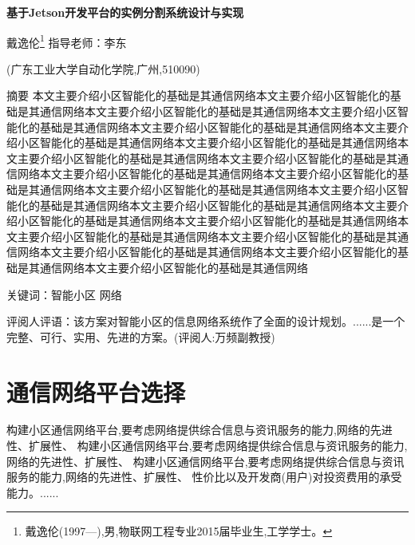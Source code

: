 \documentclass[openright, twoside]{gdutthesis-excellent}
\begin{document}
\begin{center}
{\vspace{30pt}\bfseries 基于Jetson开发平台的实例分割系统设计与实现\par\vspace{10pt}}
{\kaishu
  \vspace{0.5\baselineskip}
  戴逸伦\footnote{戴逸伦(1997—),男,物联网工程专业2015届毕业生,工学学士。} \quad\quad 指导老师：李东\par
  \vspace{0.5\baselineskip}
  (广东工业大学自动化学院,广州,510090)\par
  \vspace{0.5\baselineskip}
}
\end{center}

\renewcommand{\baselinestretch}{1.46}
\begin{flushleft}
\setlength\leftskip{2em}
\setlength\rightskip{2em}
\setlength{\parindent}{4em}
\kaishu{}
{\quad\quad\heiticu 摘\quad 要} 本文主要介绍小区智能化的基础是其通信网络本文主要介绍小区智能化的基础是其通信网络本文主要介绍小区智能化的基础是其通信网络本文主要介绍小区智能化的基础是其通信网络本文主要介绍小区智能化的基础是其通信网络本文主要介绍小区智能化的基础是其通信网络本文主要介绍小区智能化的基础是其通信网络本文主要介绍小区智能化的基础是其通信网络本文主要介绍小区智能化的基础是其通信网络本文主要介绍小区智能化的基础是其通信网络本文主要介绍小区智能化的基础是其通信网络本文主要介绍小区智能化的基础是其通信网络本文主要介绍小区智能化的基础是其通信网络本文主要介绍小区智能化的基础是其通信网络本文主要介绍小区智能化的基础是其通信网络本文主要介绍小区智能化的基础是其通信网络本文主要介绍小区智能化的基础是其通信网络本文主要介绍小区智能化的基础是其通信网络本文主要介绍小区智能化的基础是其通信网络本文主要介绍小区智能化的基础是其通信网络本文主要介绍小区智能化的基础是其通信网络\par
{\heiticu 关键词：}智能小区 网络\par
{\heiticu 评阅人评语：}该方案对智能小区的信息网络系统作了全面的设计规划。......是一个完整、可行、实用、先进的方案。(评阅人:万频副教授)\par
\end{flushleft}

\chapter{通信网络平台选择}
构建小区通信网络平台,要考虑网络提供综合信息与资讯服务的能力,网络的先进性、扩展性、
构建小区通信网络平台,要考虑网络提供综合信息与资讯服务的能力,网络的先进性、扩展性、
构建小区通信网络平台,要考虑网络提供综合信息与资讯服务的能力,网络的先进性、扩展性、
性价比以及开发商(用户)对投资费用的承受能力。......\par
\end{document}
